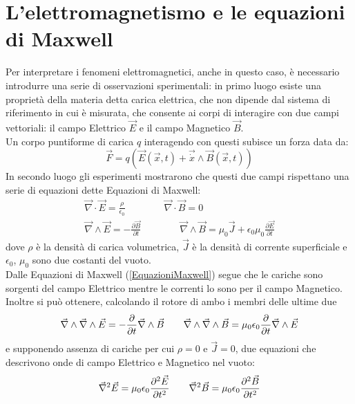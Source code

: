 \section{L'elettromagnetismo e le equazioni di Maxwell}
Per interpretare i fenomeni elettromagnetici, anche in questo caso, è necessario introdurre
una serie di osservazioni sperimentali: in primo luogo esiste una proprietà della materia 
detta carica elettrica, che non dipende dal sistema di riferimento in cui è misurata, che consente 
ai corpi di interagire con due campi vettoriali: 
il campo Elettrico $\vec{E}$ e il campo Magnetico $\vec{B}$.\\ Un corpo puntiforme di carica 
$q$ interagendo con questi subisce un forza data da:
\begin{equation}
	\vec{F}=q(\vec{E}(\vec{x},t)+\vec{\dot{x}}\wedge\vec{B}(\vec{x},t))
	\label{ForzaLorentz}
\end{equation}
In secondo luogo gli esperimenti mostrarono che questi due campi rispettano una serie di equazioni 
dette Equazioni di Maxwell:
\begin{equation}
	\begin{gathered}
		\vec{\nabla}\cdot\vec{E}=\frac{\rho}{\epsilon_0} \qquad \qquad \vec{\nabla}\cdot\vec{B}=0 \\
		\vec{\nabla}\wedge\vec{E}=-\frac{\partial\vec{B}}{\partial t} \qquad \qquad \vec{\nabla}\wedge
		\vec{B}=\mu_0\vec{J}+\epsilon_0\mu_0\frac{\partial\vec{E}}{\partial t}
		\label{EquazioniMaxwell}
	\end{gathered}
\end{equation}
dove $\rho$ è la densità di carica volumetrica, $\vec{J}$ è la densità di corrente superficiale e 
$\epsilon_0$, $\mu_0$ sono due costanti del vuoto.\\

Dalle Equazioni di Maxwell (\ref{EquazioniMaxwell}) segue che le cariche sono sorgenti del campo 
Elettrico mentre le correnti lo sono per 
il campo Magnetico.\\ 

Inoltre si può ottenere, calcolando il rotore di ambo 
i membri delle ultime due
\begin{equation*}
	\vec{\nabla}\wedge\vec{\nabla}\wedge\vec{E}=-\frac{\partial}{\partial t}\vec{\nabla}\wedge\vec{B} 
	\qquad \vec{\nabla}\wedge\vec{\nabla}\wedge\vec{B}=\mu_0\epsilon_0\frac{\partial}{\partial t}
	\vec{\nabla}\wedge\vec{E}
\end{equation*}
e supponendo assenza di cariche per cui $\rho=0$ e $\vec{J}=0$, due equazioni che descrivono 
onde di campo Elettrico e Magnetico nel vuoto:
\begin{equation}
	\vec{\nabla}^2\vec{E}=\mu_0\epsilon_0\frac{\partial^2\vec{E}}{\partial t^2} \qquad \vec{\nabla}^2\vec{B}=
	\mu_0\epsilon_0\frac{\partial^2\vec{B}}{\partial t^2}
\end{equation}

